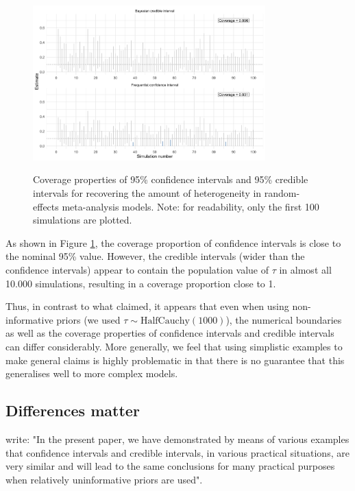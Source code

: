 \documentclass[a4paper,man,natbib,floatsintext,donotrepeattitle]{apa6}
\begin{document}
\begin{figure}[H]
  \caption{Coverage properties of 95\% confidence intervals and 95\% credible intervals for recovering the amount of heterogeneity in random-effects meta-analysis models. Note: for readability, only the first 100 simulations are plotted.}
  \centering
  \includegraphics[width=0.8\textwidth]{coverage2.png}
  \label{fig:coverage2}
\end{figure}

As shown in Figure \ref{fig:coverage2}, the coverage proportion of confidence intervals is close to the nominal 95\% value. However, the credible intervals (wider than the confidence intervals) appear to contain the population value of $\tau$ in almost all 10.000 simulations, resulting in a coverage proportion close to 1.

Thus, in contrast to what \cite{albers_credible_2018} claimed, it appears that even when using non-informative priors (we used $\tau \sim \mathrm{HalfCauchy}(1000)$), the numerical boundaries as well as the coverage properties of confidence intervals and credible intervals can differ considerably. More generally, we feel that using simplistic examples to make general claims is highly problematic in that there is no guarantee that this generalises well to more complex models.

\subsection{Differences matter}

\cite{albers_credible_2018} write: "In the present paper, we have demonstrated by means of various examples that confidence intervals and credible intervals, in various practical situations, are very similar and will lead to the same conclusions for many practical purposes when relatively uninformative priors are used".
\end{document}
